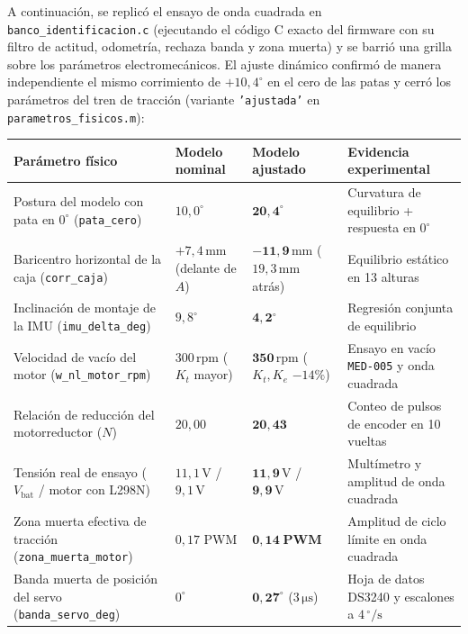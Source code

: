 \documentclass[11pt,a4paper]{report}
\newcommand{\ud}[1]{\,\mathrm{#1}}
\begin{document}
A continuación, se replicó el ensayo de onda cuadrada en \texttt{banco\_identificacion.c}
(ejecutando el código C exacto del firmware con su filtro de actitud, odometría, rechaza banda
y zona muerta) y se barrió una grilla sobre los parámetros electromecánicos. El ajuste dinámico
confirmó de manera independiente el mismo corrimiento de $+10{,}4^\circ$ en el cero de las patas
y cerró los parámetros del tren de tracción (variante \texttt{'ajustada'} en
\texttt{parametros\_fisicos.m}):

\begin{center}
\small
\begin{tabular}{@{}llll@{}}
\toprule
\textbf{Parámetro físico} & \textbf{Modelo nominal} & \textbf{Modelo ajustado} & \textbf{Evidencia experimental} \\
\midrule
Postura del modelo con pata en $0^\circ$ (\texttt{pata\_cero}) & $10{,}0^\circ$ & $\mathbf{20{,}4^\circ}$ & Curvatura de equilibrio + respuesta en $0^\circ$ \\
Baricentro horizontal de la caja (\texttt{corr\_caja}) & $+7{,}4\ud{mm}$ (delante de $A$) & $\mathbf{-11{,}9\ud{mm}}$ ($19{,}3\ud{mm}$ atrás) & Equilibrio estático en 13 alturas \\
Inclinación de montaje de la IMU (\texttt{imu\_delta\_deg}) & $9{,}8^\circ$ & $\mathbf{4{,}2^\circ}$ & Regresión conjunta de equilibrio \\
Velocidad de vacío del motor (\texttt{w\_nl\_motor\_rpm}) & $300\ud{rpm}$ ($K_t$ mayor) & $\mathbf{350\ud{rpm}}$ ($K_t, K_e$ $-14\%$) & Ensayo en vacío \texttt{MED-005} y onda cuadrada \\
Relación de reducción del motorreductor ($N$) & $20{,}00$ & $\mathbf{20{,}43}$ & Conteo de pulsos de encoder en 10 vueltas \\
Tensión real de ensayo ($V_{\text{bat}}$ / motor con L298N) & $11{,}1\ud{V}$ / $9{,}1\ud{V}$ & $\mathbf{11{,}9\ud{V}}$ / $\mathbf{9{,}9\ud{V}}$ & Multímetro y amplitud de onda cuadrada \\
Zona muerta efectiva de tracción (\texttt{zona\_muerta\_motor}) & $0{,}17$ PWM & $\mathbf{0{,}14\;\text{PWM}}$ & Amplitud de ciclo límite en onda cuadrada \\
Banda muerta de posición del servo (\texttt{banda\_servo\_deg}) & $0^\circ$ & $\mathbf{0{,}27^\circ}$ ($3\ud{\mu s}$) & Hoja de datos DS3240 y escalones a $4\ud{^\circ/s}$ \\
\bottomrule
\end{tabular}
\end{center}
\end{document}
